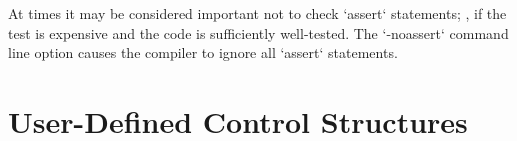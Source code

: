At times it may be considered important not to check \xcd`assert` statements;
\eg, if the test is expensive and the code is sufficiently well-tested.  The
\xcd`-noassert` command line option causes the compiler to ignore all
\xcd`assert` statements. 


\section{User-Defined Control Structures}

\newcommand{\vardecl}[2]{\ensuremath{{#1}\texttt{:}{#2}}}

\newcommand{\usrFor}[5]{\ensuremath{{#1}\texttt{.for}\texttt{[}{#2}\texttt{]}^?\texttt{(}({#3}\texttt{~in})^?~{#4}\texttt{)~}{#5}}}
\newcommand{\libFor}[5]{\ensuremath{{#1}\texttt{.operator~for}\texttt{[}{#2}\texttt{]}^?\texttt{(}{#4}\texttt{,}~\texttt{(}{#3}^?\texttt{)}~\texttt{=>}~{#5}\texttt{);}}}

\newcommand{\usrIf}[5]{\ensuremath{{#1}\texttt{.if}\texttt{[}{#2}\texttt{]}^?\texttt{(}{#3}\texttt{)~}{#4}~(\texttt{else~}{#5})^?}}
\newcommand{\libIf}[5]{\ensuremath{{#1}\texttt{.operator~if}\texttt{[}{#2}\texttt{]}^?\texttt{(}{#3}\texttt{,}~%
    \texttt{()=>}~{#4}(\texttt{,}~%
    \texttt{()}\texttt{=>}~{#5})^?\texttt{);}}}


\newcommand{\usrTry}[7]{\ensuremath{{#1}\texttt{.try}\texttt{[}{#2}\texttt{]}^?\texttt{(}{#3}\texttt{)}^?~{#4}\texttt{~catch~(}{#5}\texttt{)~}{#6}~(\texttt{finally~}{#7})^?}}
\newcommand{\libTry}[7]{\ensuremath{{#1}\texttt{.operator~try}\texttt{[}{#2}\texttt{]}^?\texttt{(}%
    ({#3}\texttt{,})^?~%
    \texttt{()=>}~{#4}\texttt{,}~%
    \texttt{(}{#5}\texttt{)}~\texttt{=>}~{#6}(\texttt{,}~%
    \texttt{()=>}~{#7})^?\texttt{);}}}

